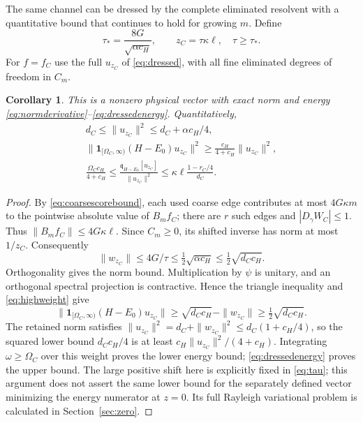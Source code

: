 \documentclass[11pt]{article}
\newtheorem{corollary}[theorem]{Corollary}
\begin{document}
The same channel can be dressed by the complete eliminated resolvent
with a quantitative bound that continues to hold for growing $m$.
Define
\begin{equation}\label{eq:tau}
 \tau_* =\frac{8G}{\sqrt{\alpha c_H}},\qquad
 z_C=\tau\kappa\ell,\quad\tau\geq\tau_*.
\end{equation}
For $f=f_C$ use the full $u_{z_C}$ of \eqref{eq:dressed}, with all
fine eliminated degrees of freedom in $C_m$.
\begin{corollary}\label{cor:dressedweight}
This is a nonzero physical vector with exact norm and energy
\eqref{eq:normderivative}--\eqref{eq:dressedenergy}. Quantitatively,
\begin{gather}
 d_C\leq\|u_{z_C}\|^2\leq d_C+\alpha c_H/4,\nonumber\\
 \|\mathbf1_{[\Omega_C,\infty)}(H-E_0)u_{z_C}\|^2
 \geq\frac{c_H}{4+c_H}\|u_{z_C}\|^2,\label{eq:dressedweight}\\
 \frac{\Omega_Cc_H}{4+c_H}
 \leq\frac{\mathfrak q_{H-E_0}[u_{z_C}]}{\|u_{z_C}\|^2}
 \leq\kappa\ell\frac{1-r_C/4}{d_C}.
\end{gather}
\end{corollary}
\begin{proof}
By \eqref{eq:coarsescorebound}, each used coarse edge contributes at
most $4G\kappa m$ to the pointwise absolute value of $B_mf_C$;
there are $r$ such edges and $|D_\gamma W_C|\leq1$.
Thus $\|B_mf_C\|\leq4G\kappa\ell$.
Since $C_m\geq0$, its shifted inverse has norm at most $1/z_C$.
Consequently
\[
 \|w_{z_C}\|\leq4G/\tau\leq\tfrac12\sqrt{\alpha c_H}
                              \leq\tfrac12\sqrt{d_Cc_H}.
\]
Orthogonality gives the norm bound. Multiplication by $\psi$ is unitary,
and an orthogonal spectral projection is contractive. Hence the triangle
inequality and \eqref{eq:highweight} give
\[
 \|\mathbf1_{[\Omega_C,\infty)}(H-E_0)u_{z_C}\|
 \geq\sqrt{d_Cc_H}-\|w_{z_C}\|
 \geq\tfrac12\sqrt{d_Cc_H}.
\]
The retained norm satisfies
$\|u_{z_C}\|^2=d_C+\|w_{z_C}\|^2\leq d_C(1+c_H/4)$,
so the squared lower bound $d_Cc_H/4$ is at least
$c_H\|u_{z_C}\|^2/(4+c_H)$.
Integrating $\omega\geq\Omega_C$ over this weight proves the lower
energy bound; \eqref{eq:dressedenergy} proves the upper bound.
The large positive shift here is explicitly fixed in \eqref{eq:tau};
this argument does not assert the same lower bound for the separately
defined vector minimizing the energy numerator at $z=0$. Its full
Rayleigh variational problem is calculated in Section~\ref{sec:zero}.
\end{proof}
\end{document}
